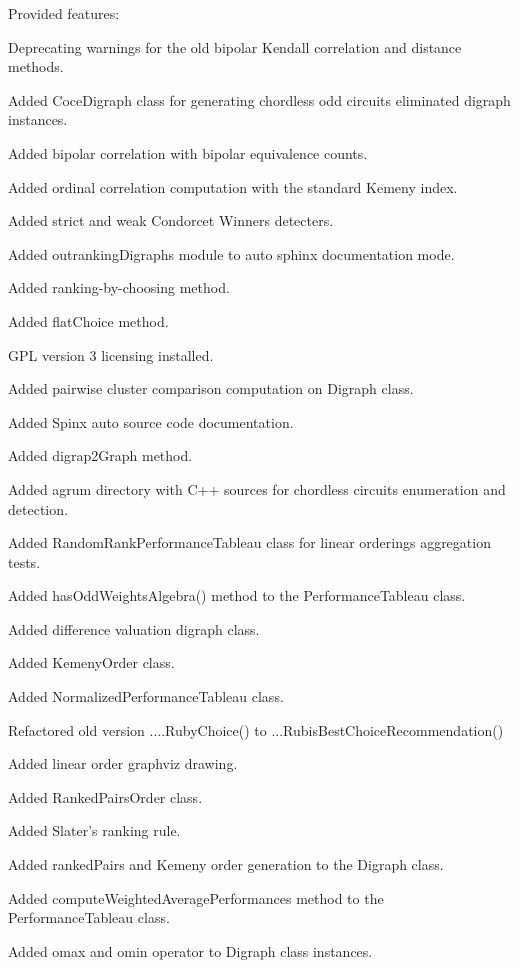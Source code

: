\documentclass{article}
\newcommand{\+}{\verb+}
\renewcommand{\*}{\back{}}
\begin{document}
\begin{center}
Provided features:
\begin{menu}
\item Deprecating warnings for the old bipolar Kendall correlation and distance methods.
\item Added CoceDigraph class for generating chordless odd circuits eliminated digraph instances.
\item Added bipolar correlation with bipolar equivalence counts.
\item Added ordinal correlation computation with the standard Kemeny index.
\item Added strict and weak Condorcet Winners detecters.
\item Added outrankingDigraphs module to auto sphinx documentation mode.
\item Added ranking-by-choosing method.
\item Added flatChoice method.
\item GPL version 3 licensing installed.
\item Added pairwise cluster comparison computation on Digraph class.
\item Added Spinx auto source code documentation.
\item Added digrap2Graph method.
\item Added agrum directory with C++ sources for chordless circuits enumeration and detection.
\item Added RandomRankPerformanceTableau class for linear orderings aggregation tests.
\item Added hasOddWeightsAlgebra() method to the PerformanceTableau class.
\item Added difference valuation digraph class.
\item Added KemenyOrder class.
\item Added NormalizedPerformanceTableau class.
\item Refactored old version ....RubyChoice() to ...RubisBestChoiceRecommendation()
\item Added linear order graphviz drawing.
\item Added RankedPairsOrder class.
\item Added Slater's ranking rule.
\item Added rankedPairs and Kemeny order generation to the Digraph class.
\item Added computeWeightedAveragePerformances method to the PerformanceTableau class.
\item Added omax and omin operator to Digraph class instances.

\end{menu}
\end{center}
\end{document}
